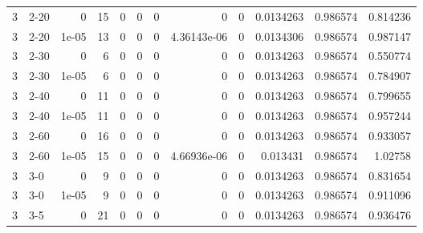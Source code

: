 \begin{tabular}{rlrrrrrrrrrr}
     3 & 2-20   &      0     &          15 &                 0 &                 0 &     0           &     0           &      0           &        0.0134263 &               0.986574 &           0.814236 \\
     3 & 2-20   &      1e-05 &          13 &                 0 &                 0 &     0           &     4.36143e-06 &      0           &        0.0134306 &               0.986574 &           0.987147 \\
     3 & 2-30   &      0     &           6 &                 0 &                 0 &     0           &     0           &      0           &        0.0134263 &               0.986574 &           0.550774 \\
     3 & 2-30   &      1e-05 &           6 &                 0 &                 0 &     0           &     0           &      0           &        0.0134263 &               0.986574 &           0.784907 \\
     3 & 2-40   &      0     &          11 &                 0 &                 0 &     0           &     0           &      0           &        0.0134263 &               0.986574 &           0.799655 \\
     3 & 2-40   &      1e-05 &          11 &                 0 &                 0 &     0           &     0           &      0           &        0.0134263 &               0.986574 &           0.957244 \\
     3 & 2-60   &      0     &          16 &                 0 &                 0 &     0           &     0           &      0           &        0.0134263 &               0.986574 &           0.933057 \\
     3 & 2-60   &      1e-05 &          15 &                 0 &                 0 &     0           &     4.66936e-06 &      0           &        0.013431  &               0.986574 &           1.02758  \\
     3 & 3-0    &      0     &           9 &                 0 &                 0 &     0           &     0           &      0           &        0.0134263 &               0.986574 &           0.831654 \\
     3 & 3-0    &      1e-05 &           9 &                 0 &                 0 &     0           &     0           &      0           &        0.0134263 &               0.986574 &           0.911096 \\
     3 & 3-5    &      0     &          21 &                 0 &                 0 &     0           &     0           &      0           &        0.0134263 &               0.986574 &           0.936476 \\

\end{tabular}
